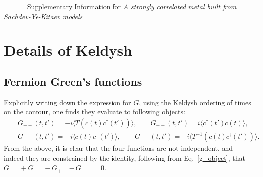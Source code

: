 \documentclass[twocolumn,floatfix,superscriptaddress]{revtex4-1}
\newcommand{\ket}{\rangle}
\newcommand{\bra}{\langle}
\begin{document}
\begin{widetext}
% 
 


 ~
 ~
 ~
 ~
 \newpage
  \appendix
{\Large Supplementary Information for \textit{A strongly correlated metal built from Sachdev-Ye-Kitaev models}}


\section{Details of Keldysh}
\label{sec:details-keldysh}

\subsection{Fermion Green's functions}
\label{sec:ferm-greens-funct}

Explicitly writing down the expression for $G$, using the Keldysh
ordering of times on the contour, one finds they evaluate to following objects:
\begin{eqnarray}
\label{g_object}
&&G_{++}(t,t')=-i\bra T(c(t)c^\dagger(t'))\ket,\qquad G_{+-}(t,t')=i\bra c^\dagger(t')c(t)\ket,\nonumber\\
&&G_{-+}(t,t')=-i\bra c(t) c^\dagger(t')\ket,\qquad G_{--}(t,t')=-i\bra T^{-1}(c(t) c^\dagger(t'))\ket.
\end{eqnarray}
From the above, it is clear that the four functions are not
independent, and indeed they are constrained by the identity,
following from Eq.~\eqref{g_object}, that $ G_{++}+ G_{--}- G_{+-}- G_{-+}=0$.


\end{widetext}
\end{document}
